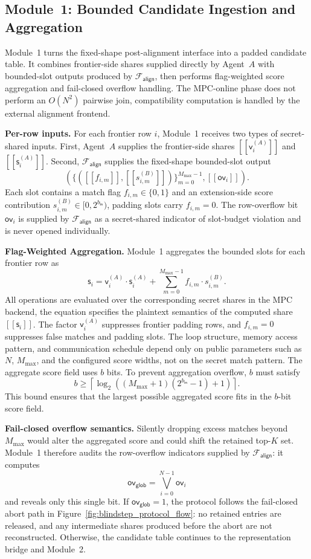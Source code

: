 \documentclass[conference,compsoc,letterpaper]{IEEEtran}
\theoremstyle{definition}
\theoremstyle{remark}
\newcommand{\share}[1]{[\![#1]\!]}           %
\newcommand{\Falign}{\mathcal{F}_{\mathsf{align}}}
\newcommand{\Mmax}{M_{\max}}
\newcommand{\scorebits}{b}
\newcommand{\valid}{\mathsf{v}}
\newcommand{\score}{\mathsf{s}}
\newcommand{\overflow}{\mathsf{ov}}
\newcommand{\globaloverflow}{\mathsf{ov}_{\mathsf{glob}}}
\begin{document}
\subsection{Module~1: Bounded Candidate Ingestion and Aggregation}
\label{subsec:module1}

Module~1 turns the fixed-shape post-alignment interface into a padded candidate table.
It combines frontier-side shares supplied directly by Agent~$A$ with bounded-slot outputs produced by $\Falign{}$, then performs flag-weighted score aggregation and fail-closed overflow handling.
The MPC-online phase does not perform an $O(N^2)$ pairwise join, compatibility computation is handled by the external alignment frontend.
\smallskip

\noindent\textbf{Per-row inputs.}
For each frontier row $i$, Module~1 receives two types of secret-shared inputs.
First, Agent~$A$ supplies the frontier-side shares $\share{\valid_i^{(A)}}$ and $\share{\score_i^{(A)}}$.
Second, $\Falign{}$ supplies the fixed-shape bounded-slot output
\[
\left(
  \{(\share{f_{i,m}},\share{s^{(B)}_{i,m}})\}_{m=0}^{\Mmax-1},
  \share{\overflow_i}
\right).
\]
Each slot contains a match flag $f_{i,m}\in\{0,1\}$ and an extension-side score contribution $s^{(B)}_{i,m}\in[0,2^{b_{\mathsf{in}}})$, padding slots carry $f_{i,m}=0$.
The row-overflow bit $\overflow_i$ is supplied by $\Falign{}$ as a secret-shared indicator of slot-budget violation and is never opened individually.
\smallskip

\noindent\textbf{Flag-Weighted Aggregation.}
Module~1 aggregates the bounded slots for each frontier row as
\[
\score_i
=
\valid_i^{(A)}\cdot\score_i^{(A)}
+
\sum_{m=0}^{\Mmax-1}
  f_{i,m}\cdot s^{(B)}_{i,m}.
\]
All operations are evaluated over the corresponding secret shares in the MPC backend, the equation specifies the plaintext semantics of the computed share $\share{\score_i}$.
The factor $\valid_i^{(A)}$ suppresses frontier padding rows, and $f_{i,m}=0$ suppresses false matches and padding slots.
The loop structure, memory access pattern, and communication schedule depend only on public parameters such as $N$, $\Mmax$, and the configured score widths, not on the secret match pattern.
The aggregate score field uses $\scorebits$ bits.
To prevent aggregation overflow, $\scorebits$ must satisfy
\[
\scorebits \ge
\left\lceil
\log_2\!\left((\Mmax+1)(2^{b_{\mathsf{in}}}-1)+1\right)
\right\rceil .
\]
This bound ensures that the largest possible aggregated score fits in the $\scorebits$-bit score field.
\smallskip

\noindent\textbf{Fail-closed overflow semantics.}
Silently dropping excess matches beyond $\Mmax$ would alter the aggregated score and could shift the retained top-$K$ set.
Module~1 therefore audits the row-overflow indicators supplied by $\Falign{}$: it computes
\[
\globaloverflow=\bigvee_{i=0}^{N-1}\overflow_i
\]
and reveals only this single bit.
If $\globaloverflow=1$, the protocol follows the fail-closed abort path in Figure~\ref{fig:blindstep_protocol_flow}: no retained entries are released, and any intermediate shares produced before the abort are not reconstructed.
Otherwise, the candidate table continues to the representation bridge and Module~2.
\smallskip
\end{document}
